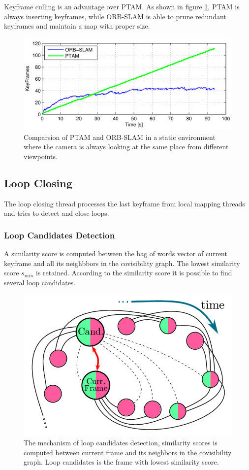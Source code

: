 \documentclass[letterpaper, 10 pt, conference]{ieeeconf}  %
\begin{document}
Keyframe culling is an advantage over PTAM. As shown in figure \ref{KF_culling}, PTAM is always inserting keyframes, while ORB-SLAM is able to prune redundant keyframes and maintain a map with proper size. 
%
\begin{figure}[!htbp]%
\centering
\includegraphics[scale=0.18]{./images/PTAM_ORB_KF_CULLING}
\caption{Comparsion of PTAM and ORB-SLAM in a static environment where the camera is always looking at the same place from different viewpoints. \cite{ORBSLAM}}
\label{KF_culling}
\end{figure}
%

\subsection{Loop Closing}
The loop closing thread processes the last keyframe from local mapping threads and tries to detect and close loops.
\subsubsection{Loop Candidates Detection}
A similarity score is computed between the bag of words vector of current keyframe and all its neighbbors in the covisibility graph. The lowest similarity score $s_{min}$ is retained. According to the similarity score it is possible to find several loop candidates.
%
\begin{figure}[!htbp]%
\centering
\includegraphics[scale=0.19]{./images/loop_detection}
\caption{The mechanism of loop candidates detection, similarity scores is computed between current frame and its neighbors in the covisibility graph. Loop candidates is the frame with lowest similarity score.}
\label{loop_detection}
\end{figure}
%
\end{document}
